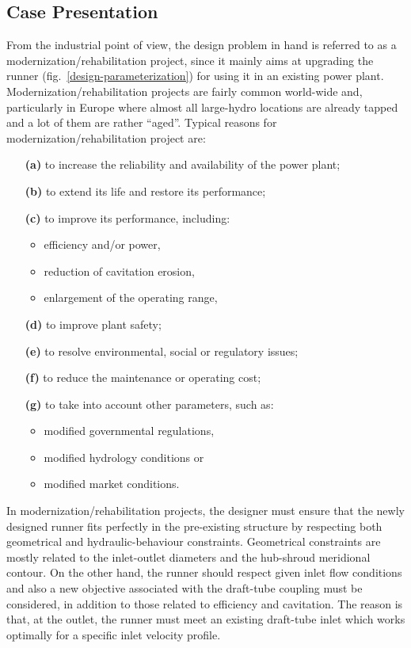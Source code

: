 \subsection{Case Presentation}
From the industrial point of view, the design problem in hand is referred to as a modernization/rehabilitation project, since it mainly aims at upgrading the runner (fig.\  \ref{design-parameterization}) for using it in an existing power plant. Modernization/rehabilitation projects are fairly common world-wide and, particularly in Europe where almost all large-hydro locations are already tapped and a lot of them are rather ``aged''. Typical reasons for modernization/rehabilitation project are:
\begin{itemize}
\item[\textbf{(a)}] to increase the reliability and availability of the power plant; 
\item[\textbf{(b)}] to extend its life and restore its performance; 
\item[\textbf{(c)}] to improve its performance, including:
\begin{itemize}
	\item efficiency and/or power,
    \item reduction of cavitation erosion,
	\item enlargement of the operating range,
\end{itemize}
\item[\textbf{(d)}] to improve plant safety;
\item[\textbf{(e)}] to resolve environmental, social or regulatory issues;
\item[\textbf{(f)}] to reduce the maintenance or operating cost;
\item[\textbf{(g)}] to take into account other parameters, such as:
\begin{itemize}
	\item modified governmental regulations,
	\item modified hydrology conditions or
	\item modified market conditions.
\end{itemize}
\end{itemize}

In modernization/rehabilitation projects, the designer must ensure that the newly designed runner fits perfectly in the pre-existing structure by respecting both geometrical and hydraulic-behaviour constraints. Geometrical constraints are mostly related to the inlet-outlet diameters and the hub-shroud meridional contour. On the other hand, the runner should respect given inlet flow conditions and also a new objective associated with the draft-tube coupling must be considered, in addition to those related to efficiency and cavitation. The reason is that, at the outlet, the runner must meet an existing draft-tube inlet which works optimally for a specific inlet velocity profile.      
  
